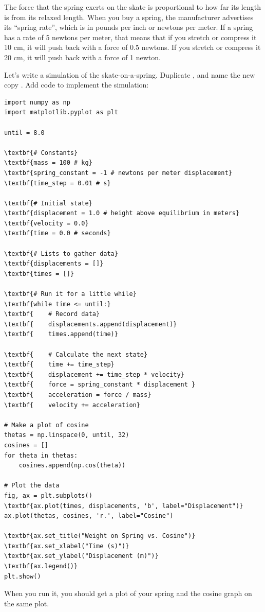 The force that the spring exerts on the skate is proportional to how
far its length is from its relaxed length. When you buy a spring, the
manufacturer advertises its ``spring rate'', which is in pounds per
inch or newtons per meter.  If a spring has a rate of 5 newtons per
meter, that means that if you stretch or compress it 10 cm, it will push
back with a force of 0.5 newtons. If you stretch or compress it 20 cm,
it will push back with a force of 1 newton.

Let's write a simulation of the skate-on-a-spring. Duplicate , and name the new copy .  Add code to implement the simulation:

\begin{Verbatim}[commandchars=\\\{\}]
import numpy as np
import matplotlib.pyplot as plt

until = 8.0

\textbf{# Constants}
\textbf{mass = 100 # kg}
\textbf{spring_constant = -1 # newtons per meter displacement}
\textbf{time_step = 0.01 # s}

\textbf{# Initial state}
\textbf{displacement = 1.0 # height above equilibrium in meters}
\textbf{velocity = 0.0}
\textbf{time = 0.0 # seconds}

\textbf{# Lists to gather data}
\textbf{displacements = []}
\textbf{times = []}

\textbf{# Run it for a little while}
\textbf{while time <= until:}
\textbf{    # Record data}
\textbf{    displacements.append(displacement)}
\textbf{    times.append(time)}

\textbf{    # Calculate the next state}
\textbf{    time += time_step}
\textbf{    displacement += time_step * velocity}
\textbf{    force = spring_constant * displacement }
\textbf{    acceleration = force / mass}
\textbf{    velocity += acceleration}

# Make a plot of cosine
thetas = np.linspace(0, until, 32)
cosines = []
for theta in thetas:
    cosines.append(np.cos(theta))

# Plot the data
fig, ax = plt.subplots()
\textbf{ax.plot(times, displacements, 'b', label="Displacement")}
ax.plot(thetas, cosines, 'r.', label="Cosine")

\textbf{ax.set_title("Weight on Spring vs. Cosine")}
\textbf{ax.set_xlabel("Time (s)")}
\textbf{ax.set_ylabel("Displacement (m)")}
\textbf{ax.legend()}
plt.show()
\end{Verbatim}
When you run it, you should get a plot of your spring and the cosine graph on the same plot.

